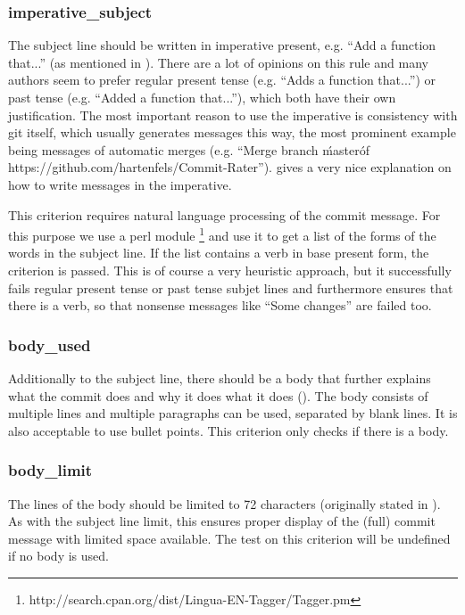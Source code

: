 \subsubsection{imperative_subject}
\label{subs:imperative_subject}
The subject line should be written in imperative present, e.g. ``Add a function that...'' (as mentioned in \cite{OffGuide}). There are a lot of opinions on this rule and many authors seem to prefer regular present tense (e.g. ``Adds a function that...'') or past tense (e.g. ``Added a function that...''), which both have their own justification. The most important reason to use the imperative is consistency with git itself, which usually generates messages this way, the most prominent example being messages of automatic merges (e.g. ``Merge branch \'master\' of https://github.com/hartenfels/Commit-Rater''). \cite{CB} gives a very nice explanation on how to write messages in the imperative.

This criterion requires natural language processing of the commit
message. For this purpose we use a perl module \footnote{http://search.cpan.org/dist/Lingua-EN-Tagger/Tagger.pm} and use it to get a list of the forms of the words in the subject line. If the list contains a verb in base present form, the criterion is passed. This is of course a very heuristic approach, but it successfully fails regular present tense or past tense subjet lines and furthermore ensures that there is a verb, so that nonsense messages like ``Some changes'' are failed too.

\subsubsection{body_used}
\label{subs:body_used}
Additionally to the subject line, there should be a body that further explains what the commit does and why it does what it does (\cite{OffGuide}). The body consists of multiple lines and multiple paragraphs can be used, separated by blank lines. It is also acceptable to use bullet points. This criterion only checks if there is a body.

\subsubsection{body_limit}
\label{subs:body_limit}
The lines of the body should be limited to 72 characters (originally stated in \cite{TP}). As with the subject line limit, this ensures proper display of the (full) commit message with limited space available. The test on this criterion will be undefined if no body is used.

